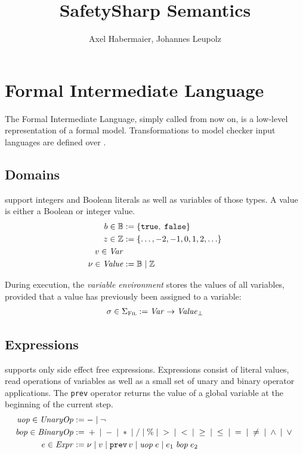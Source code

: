 \documentclass[a4paper,10pt,english]{article}
\title{SafetySharp Semantics}
\author{Axel Habermaier, Johannes Leupolz}
\begin{document}
 
\maketitle

\section{Formal Intermediate Language}
The Formal Intermediate Language, simply called \Fil from now on, is a low-level representation of a formal model. Transformations
to model checker input languages are defined over \Fil.
\subsection{Domains}

\Fil support integers and Boolean literals as well as variables of those types. A value is either a Boolean or integer
value.
\begin{align*}
    b \in \mathbb{B} &:= \{ \texttt{true}, \; \texttt{false} \}
    \\
    z \in \mathbb{Z} &:= \{ \ldots, -2, -1, 0, 1, 2, \ldots \}
    \\
    v \in \mathit{Var}
    \\
    \nu \in \mathit{Value} &:= \mathbb{B} \mid \mathbb{Z}
\end{align*}

During execution, the \textit{variable environment} stores the values of all variables, provided that a value has previously been
assigned to a variable:
\begin{align*}
	\sigma \in \Sigma_\textsc{Fil} := \mathit{Var} \rightarrow \mathit{Value}_\bot
\end{align*}

\subsection{Expressions}

\Fil supports only side effect free expressions. Expressions consist of literal values, read operations of variables as
well as a small set of unary and binary operator applications. The \texttt{prev} operator returns the value of a global
variable at the beginning of the current step.
\begin{align*}
	\mathit{uop} \in \mathit{UnaryOp} & := - \mid \neg
	\\
    \mathit{bop} \in \mathit{BinaryOp} & := {} + {} \mid {} - {} \mid {} \ast {} \mid {} / {}
                       \mid {} \% {} \mid {} > {} \mid {} < {} \mid {} \geq {} 
                       \mid {} \leq {} \mid {} = {} \mid {} \neq {} \mid {} \wedge {} \mid {} \vee {}
	\\
	e \in \mathit{Expr} & := 
		\nu \mid
		v \mid
		\mathtt{prev} \,v \mid
		\mathit{uop}\; e \mid
		e_1 \;\mathit{bop}\; e_2
\end{align*}
\end{document}
